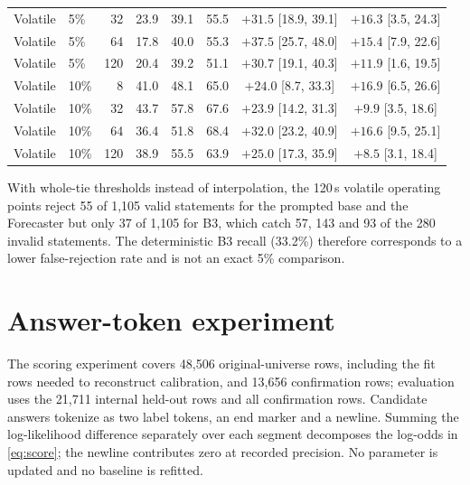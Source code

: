\documentclass[10pt]{article}
\begin{document}
\begin{table}[h]
\begin{tabular}{llrrrrcc}
Volatile & 5\% & 32 & 23.9 & 39.1 & 55.5 & $+31.5$ [18.9, 39.1] & $+16.3$ [3.5, 24.3] \\
Volatile & 5\% & 64 & 17.8 & 40.0 & 55.3 & $+37.5$ [25.7, 48.0] & $+15.4$ [7.9, 22.6] \\
Volatile & 5\% & 120 & 20.4 & 39.2 & 51.1 & $+30.7$ [19.1, 40.3] & $+11.9$ [1.6, 19.5] \\
\midrule
Volatile & 10\% & 8 & 41.0 & 48.1 & 65.0 & $+24.0$ [8.7, 33.3] & $+16.9$ [6.5, 26.6] \\
Volatile & 10\% & 32 & 43.7 & 57.8 & 67.6 & $+23.9$ [14.2, 31.3] & $+9.9$ [3.5, 18.6] \\
Volatile & 10\% & 64 & 36.4 & 51.8 & 68.4 & $+32.0$ [23.2, 40.9] & $+16.6$ [9.5, 25.1] \\
Volatile & 10\% & 120 & 38.9 & 55.5 & 63.9 & $+25.0$ [17.3, 35.9] & $+8.5$ [3.1, 18.4] \\
\bottomrule
\end{tabular}
\end{table}

With whole-tie thresholds instead of interpolation, the 120\,s volatile operating points reject 55 of 1,105 valid statements for the prompted base and the Forecaster but only 37 of 1,105 for B3, which catch 57, 143 and 93 of the 280 invalid statements. The deterministic B3 recall (33.2\%) therefore corresponds to a lower false-rejection rate and is not an exact 5\% comparison.

\section{Answer-token experiment}
\label{app:tokens}

The scoring experiment covers 48,506 original-universe rows, including the fit rows needed to reconstruct calibration, and 13,656 confirmation rows; evaluation uses the 21,711 internal held-out rows and all confirmation rows. Candidate answers tokenize as two label tokens, an end marker and a newline. Summing the log-likelihood difference separately over each segment decomposes the log-odds in \cref{eq:score}; the newline contributes zero at recorded precision. No parameter is updated and no baseline is refitted.
\end{document}

